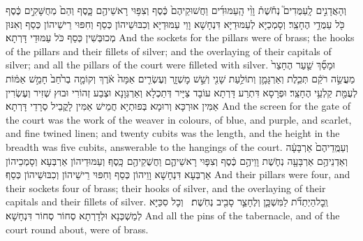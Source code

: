 {וְהָאֲדָנִ֣ים לָֽעַמֻּדִים֮ נְחֹ֒שֶׁת֒ וָוֵ֨י הָֽעַמּוּדִ֜ים וַחֲשׁוּקֵיהֶם֙ כֶּ֔סֶף וְצִפּ֥וּי רָאשֵׁיהֶ֖ם כָּ֑סֶף וְהֵם֙ מְחֻשָּׁקִ֣ים כֶּ֔סֶף כֹּ֖ל עַמֻּדֵ֥י הֶחָצֵֽר׃}
{וְסָמְכַיָּא לְעַמּוּדַיָּא דִּנְחָשָׁא וָוֵי עַמּוּדַיָּא וְכִבּוּשֵׁיהוֹן כְּסַף וְחִפּוּי רֵישֵׁיהוֹן כְּסַף וְאִנּוּן מְכוּבְּשִׁין כְּסַף כֹּל עַמּוּדֵי דָּרְתָא׃}
{And the sockets for the pillars were of brass; the hooks of the pillars and their fillets of silver; and the overlaying of their capitals of silver; and all the pillars of the court were filleted with silver.}{}
{וּמָסַ֞ךְ שַׁ֤עַר הֶחָצֵר֙ מַעֲשֵׂ֣ה רֹקֵ֔ם תְּכֵ֧לֶת וְאַרְגָּמָ֛ן וְתוֹלַ֥עַת שָׁנִ֖י וְשֵׁ֣שׁ מׇשְׁזָ֑ר וְעֶשְׂרִ֤ים אַמָּה֙ אֹ֔רֶךְ וְקוֹמָ֤ה בְרֹ֙חַב֙ חָמֵ֣שׁ אַמּ֔וֹת לְעֻמַּ֖ת קַלְעֵ֥י הֶחָצֵֽר׃}
{וּפְרָסָא דִּתְרַע דָּרְתָא עוֹבָד צַיָּיר דְּתַכְלָא וְאַרְגְּוָנָא וּצְבַע זְהוֹרִי וּבוּץ שְׁזִיר וְעֶשְׂרִין אַמִּין אוּרְכָּא וְרוּמָא בְּפוּתְיָא חֲמֵישׁ אַמִּין לָקֳבֵיל סְרָדֵי דָּרְתָא׃}
{And the screen for the gate of the court was the work of the weaver in colours, of blue, and purple, and scarlet, and fine twined linen; and twenty cubits was the length, and the height in the breadth was five cubits, answerable to the hangings of the court.}{}
{וְעַמֻּֽדֵיהֶם֙ אַרְבָּעָ֔ה וְאַדְנֵיהֶ֥ם אַרְבָּעָ֖ה נְחֹ֑שֶׁת וָוֵיהֶ֣ם כֶּ֔סֶף וְצִפּ֧וּי רָאשֵׁיהֶ֛ם וַחֲשֻׁקֵיהֶ֖ם כָּֽסֶף׃}
{וְעַמּוּדֵיהוֹן אַרְבְּעָא וְסָמְכֵיהוֹן אַרְבְּעָא דִּנְחָשָׁא וָוֵיהוֹן כְּסַף וְחִפּוּי רֵישֵׁיהוֹן וְכִבּוּשֵׁיהוֹן כְּסַף׃}
{And their pillars were four, and their sockets four of brass; their hooks of silver, and the overlaying of their capitals and their fillets of silver.}{}
{וְֽכׇל\maqqaf הַיְתֵדֹ֞ת לַמִּשְׁכָּ֧ן וְלֶחָצֵ֛ר סָבִ֖יב נְחֹֽשֶׁת׃ \setuma }
{וְכָל סִכַּיָּא לְמַשְׁכְּנָא וּלְדָרְתָא סְחוֹר סְחוֹר דִּנְחָשָׁא׃}
{And all the pins of the tabernacle, and of the court round about, were of brass.}{}

